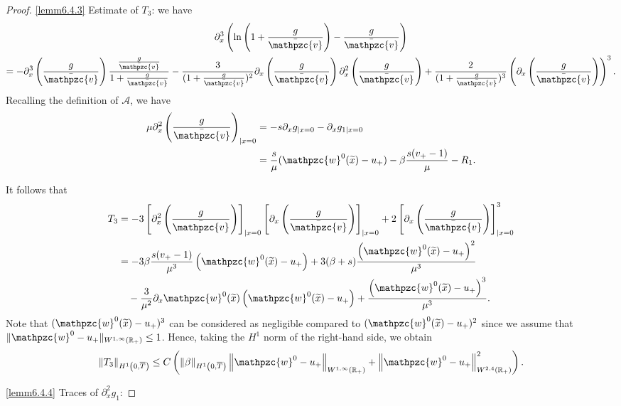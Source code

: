\documentclass[AHL,Unicode,longabstracts,published]{cedram}
\newcommand{\R}{\mathbb{R}}
\newcommand{\p}{\partial}
\newcommand{\bv}{\bar{\mathpzc{v}}}
\newcommand{\cA}{\mathcal A}
\newcommand{\tw}{\mathpzc{w}}
\newcommand{\tx}{\widetilde{x}}
\newcommand{\tx}{\widetilde{x}}
\begin{document}
\begin{proof}
\noindent\eqref{lemm6.4.3} Estimate of $T_3$: we have
\begin{multline*}
\partial^3_x \left(\ln \left(1+ \frac{g}{\bv}\right) - \frac{g}{\bv} \right)\\ = - \partial^3_x \left(\frac{g}{\bv}\right) \dfrac{\frac{g}{\bv}}{1+ \frac{g}{\bv}} - \dfrac{3}{(1+\frac{g}{\bv})^2} \partial_x \left(\frac{g}{\bv}\right) \partial^2_x \left(\frac{g}{\bv}\right)
+ \dfrac{2}{(1+ \frac{g}{\bv})^3}\left(\partial_x \left(\frac{g}{\bv}\right)\right)^3.
\end{multline*}
Recalling the definition of $\cA$, we have
\begin{align*}
\mu \p_x^2 \left(\frac{g}{\bv}\right)_{|x=0}&=-s\p_x g_{|x=0} - \p_x g_{1|x=0}\\
&=\frac{s}{\mu} (\tw^0(\tx) - u_+) - \beta \frac{s(v_+-1)}{\mu} - R_1.
\end{align*}


It follows that
\begin{align*}
T_3 & = - 3 \left[\partial^2_x \left(\frac{g}{\bv}\right)\right]_{|x=0} \left[\partial_x \left(\frac{g}{\bv}\right)\right]_{|x=0} + 2\left[\partial_x \left(\frac{g}{\bv}\right)\right]^3_{|x=0} \\
& = -3\beta\dfrac{s(v_+-1)}{\mu^3} \left(\tw^0(\tx) - u_+\right) + 3 (\beta +s) \dfrac{\left(\tw^0(\tx)-u_+\right)^2}{\mu^3} \\
& \quad - \dfrac{3}{\mu^2} \partial_x \tw^0(\tx) \left(\tw^0(\tx)-u_+\right) + \dfrac{\left(\tw^0(\tx) - u_+\right)^3}{\mu^3}.
\end{align*}
Note that $(\tw^0(\tx)-u_+)^3$ can be considered as negligible compared to $(\tw^0(\tx) - u_+)^2$ since we assume that $\|\tw^0 - u_+\|_{W^{1, \infty}(\R_+)} \leq 1$. Hence, taking the $H^1$ norm of the right-hand side, we obtain
\[
\|T_3\|_{H^1\left(0,\overline{T}\right)}\leq C \left(\|\beta\|_{H^1\left(0, \overline{T}\right)}\left\|\tw^0-u_+\right\|_{W^{1,\infty}(\R_+)} + \left\|\tw^0-u_+\right\|_{W^{2,4}(\R_+)}^2\right).
\]

\noindent\eqref{lemm6.4.4} Traces of $\partial^2_x g_1$:



\end{proof}
\end{document}
